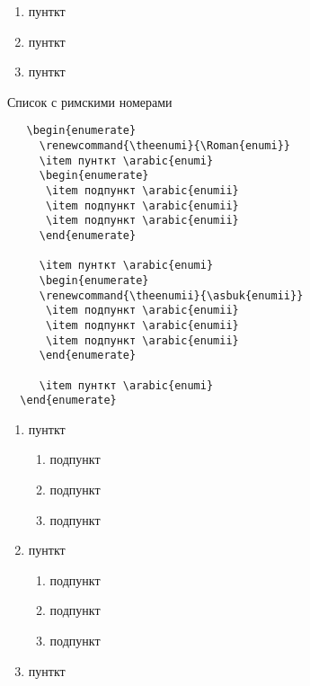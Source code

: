 \documentclass{article}
\begin{document}
     \begin{enumerate}
      
     \item пунткт     
     \item пунткт 
     \item пунткт 
     \end{enumerate}
     
Список с римскими номерами

\begin{verbatim}
   \begin{enumerate}
     \renewcommand{\theenumi}{\Roman{enumi}} 
     \item пунткт \arabic{enumi}    
     \begin{enumerate}
      \item подпункт \arabic{enumii}
      \item подпункт \arabic{enumii}
      \item подпункт \arabic{enumii}
     \end{enumerate}
 
     \item пунткт \arabic{enumi}
     \begin{enumerate}
     \renewcommand{\theenumii}{\asbuk{enumii}} 
      \item подпункт \arabic{enumii}
      \item подпункт \arabic{enumii}
      \item подпункт \arabic{enumii}
     \end{enumerate}
 
     \item пунткт \arabic{enumi}
  \end{enumerate}
\end{verbatim}

   \begin{enumerate}
     \renewcommand{\theenumi}{\Roman{enumi}} 
     \item пунткт     
     \begin{enumerate}
      \item подпункт 
      \item подпункт 
      \item подпункт 
     \end{enumerate}
 
     \item пунткт 
     \begin{enumerate}
     \renewcommand{\theenumii}{\asbuk{enumii}} 
      \item подпункт 
      \item подпункт 
      \item подпункт 
     \end{enumerate}
 
     \item пунткт 
  \end{enumerate}
     
\end{document}
